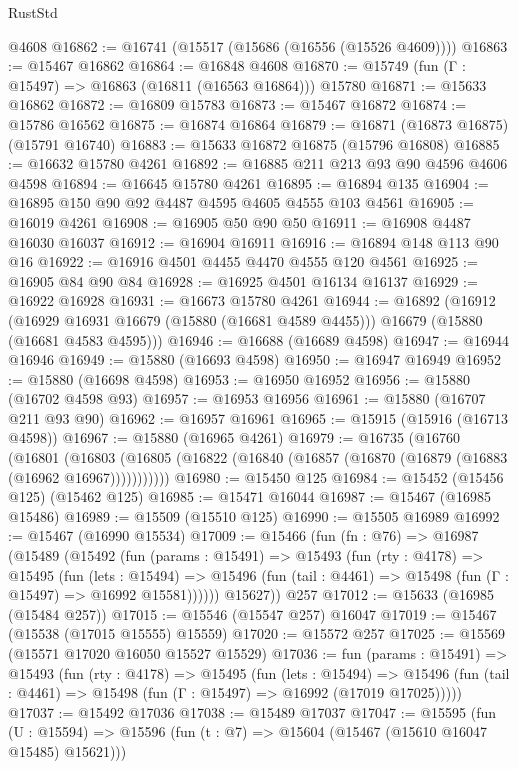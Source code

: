 \begin{lexlean}{RustStd}
\begin{coremodule}
    @4608
@16862 := @16741 (@15517 (@15686 (@16556 (@15526 @4609))))
@16863 := @15467 @16862
@16864 := @16848 @4608
@16870 := @15749 (fun (Γ : @15497) => @16863 (@16811 (@16563 @16864))) @15780
@16871 := @15633 @16862
@16872 := @16809 @15783
@16873 := @15467 @16872
@16874 := @15786 @16562
@16875 := @16874 @16864
@16879 := @16871 (@16873 @16875) (@15791 @16740)
@16883 := @15633 @16872 @16875 (@15796 @16808)
@16885 := @16632 @15780 @4261
@16892 := @16885 @211 @213 @93 @90 @4596 @4606 @4598
@16894 := @16645 @15780 @4261
@16895 := @16894 @135
@16904 := @16895 @150 @90 @92 @4487 @4595 @4605 @4555 @103 @4561
@16905 := @16019 @4261
@16908 := @16905 @50 @90 @50
@16911 := @16908 @4487 @16030 @16037
@16912 := @16904 @16911
@16916 := @16894 @148 @113 @90 @16
@16922 := @16916 @4501 @4455 @4470 @4555 @120 @4561
@16925 := @16905 @84 @90 @84
@16928 := @16925 @4501 @16134 @16137
@16929 := @16922 @16928
@16931 := @16673 @15780 @4261
@16944 := @16892
    (@16912
      (@16929 @16931 @16679 (@15880 (@16681 @4589 @4455)))
      @16679
      (@15880 (@16681 @4583 @4595)))
@16946 := @16688 (@16689 @4598)
@16947 := @16944 @16946
@16949 := @15880 (@16693 @4598)
@16950 := @16947 @16949
@16952 := @15880 (@16698 @4598)
@16953 := @16950 @16952
@16956 := @15880 (@16702 @4598 @93)
@16957 := @16953 @16956
@16961 := @15880 (@16707 @211 @93 @90)
@16962 := @16957 @16961
@16965 := @15915 (@15916 (@16713 @4598))
@16967 := @15880 (@16965 @4261)
@16979 := @16735
    (@16760
      (@16801
        (@16803 (@16805 (@16822 (@16840 (@16857 (@16870 (@16879 (@16883 (@16962 @16967)))))))))))
@16980 := @15450 @125
@16984 := @15452 (@15456 @125) (@15462 @125)
@16985 := @15471 @16044
@16987 := @15467 (@16985 @15486)
@16989 := @15509 (@15510 @125)
@16990 := @15505 @16989
@16992 := @15467 (@16990 @15534)
@17009 := @15466
    (fun (fn : @76) =>
    @16987
      (@15489
        (@15492
          (fun (params : @15491) =>
          @15493
            (fun (rty : @4178) =>
            @15495
              (fun (lets : @15494) =>
              @15496 (fun (tail : @4461) => @15498 (fun (Γ : @15497) => @16992 @15581))))))
        @15627))
    @257
@17012 := @15633 (@16985 (@15484 @257))
@17015 := @15546 (@15547 @257) @16047
@17019 := @15467 (@15538 (@17015 @15555) @15559)
@17020 := @15572 @257
@17025 := @15569 (@15571 @17020 @16050 @15527 @15529)
@17036 := fun (params : @15491) =>
  @15493
    (fun (rty : @4178) =>
    @15495
      (fun (lets : @15494) =>
      @15496 (fun (tail : @4461) => @15498 (fun (Γ : @15497) => @16992 (@17019 @17025)))))
@17037 := @15492 @17036
@17038 := @15489 @17037
@17047 := @15595
    (fun (U : @15594) => @15596 (fun (t : @7) => @15604 (@15467 (@15610 @16047 @15485) @15621)))

\end{coremodule}
\end{lexlean}
